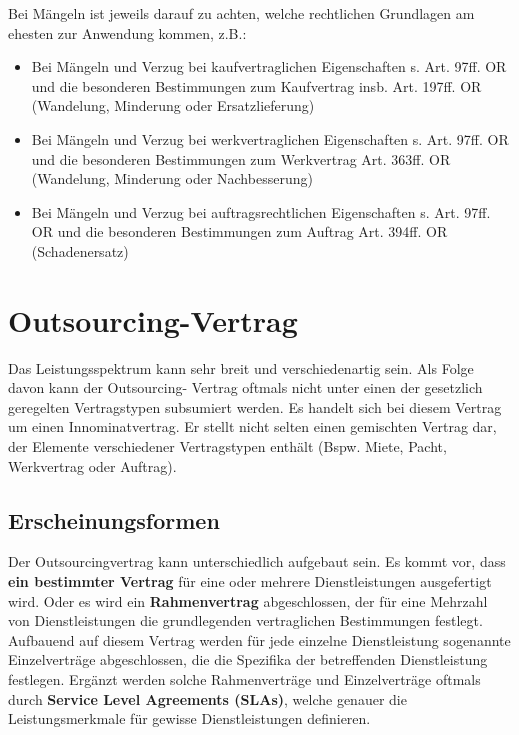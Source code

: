Bei Mängeln ist jeweils darauf zu achten, welche rechtlichen Grundlagen am ehesten zur
Anwendung kommen, z.B.:

\begin{itemize}
  \item Bei Mängeln und Verzug bei kaufvertraglichen Eigenschaften s. Art. 97ff. OR und die besonderen Bestimmungen zum Kaufvertrag insb. Art. 197ff. OR (Wandelung, Minderung oder Ersatzlieferung)
  \item Bei Mängeln und Verzug bei werkvertraglichen Eigenschaften s. Art. 97ff. OR und die besonderen Bestimmungen zum Werkvertrag Art. 363ff. OR (Wandelung, Minderung oder Nachbesserung)
  \item Bei Mängeln und Verzug bei auftragsrechtlichen Eigenschaften s. Art. 97ff. OR und die besonderen Bestimmungen zum Auftrag Art. 394ff. OR (Schadenersatz)
\end{itemize}

\section{Outsourcing-Vertrag}

Das Leistungsspektrum kann sehr breit und verschiedenartig sein. Als Folge davon kann der Outsourcing- Vertrag oftmals nicht unter einen der gesetzlich geregelten Vertragstypen subsumiert werden. Es handelt sich bei diesem Vertrag um einen Innominatvertrag. Er stellt nicht selten einen gemischten Vertrag dar, der Elemente verschiedener Vertragstypen enthält (Bspw. Miete, Pacht, Werkvertrag oder Auftrag).

\subsection{Erscheinungsformen}

Der Outsourcingvertrag kann unterschiedlich aufgebaut sein.
Es kommt vor, dass \textbf{ein bestimmter Vertrag} für eine oder mehrere Dienstleistungen
ausgefertigt wird.
Oder es wird ein \textbf{Rahmenvertrag} abgeschlossen, der für eine Mehrzahl von Dienstleistungen die grundlegenden vertraglichen Bestimmungen festlegt. Aufbauend auf diesem Vertrag werden für jede einzelne Dienstleistung sogenannte Einzelverträge abgeschlossen, die die Spezifika der betreffenden Dienstleistung festlegen.
Ergänzt werden solche Rahmenverträge und Einzelverträge oftmals durch \textbf{Service Level Agreements (SLAs)}, welche genauer die Leistungsmerkmale für gewisse Dienstleistungen definieren. 

